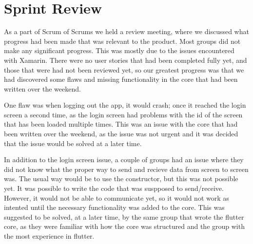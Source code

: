 \section{Sprint Review}
As a part of Scrum of Scrums we held a review meeting, where we discussed what progress had been made that was relevant to the product.
Most groups did not make any significant progress.
This was mostly due to the issues encountered with Xamarin.
There were no user stories that had been completed fully yet, and those that were had not been reviewed yet, so our greatest progress was that we had discovered some flaws and missing functionality in the core that had been written over the weekend.

One flaw was when logging out the app, it would crash; once it reached the login screen a second time, as the login screen had problems with the id of the screen that has been loaded multiple times. 
This was an issue with the core that had been written over the weekend, as the issue was not urgent and it was decided that the issue would be solved at a later time.

In addition to the login screen issue, a couple of groups had an issue where they did not know what the proper way to send and recieve data from screen to screen was.
The usual way would be to use the constructor, but this was not possible yet. 
It was possible to write the code that was suspposed to send/receive. 
However, it would not be able to communicate yet, so it would not work as intented until the necessary functionality was added to the core.
This was suggested to be solved, at a later time, by the same group that wrote the flutter core, as they were familiar with how the core was structured and the group with the most experience in flutter.
